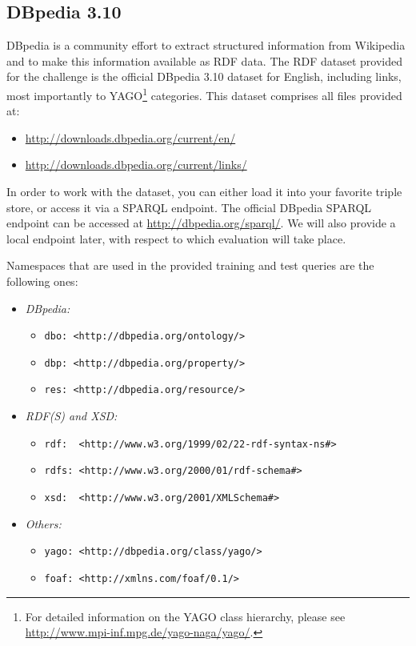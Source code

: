 

\subsection{DBpedia 3.10}
\label{sec:dbpedia}

DBpedia is a community effort to extract structured information from Wikipedia and to make this information available as RDF data. 
The RDF dataset provided for the challenge is the official DBpedia 3.10 dataset for English, including links, most importantly to YAGO\footnote{For detailed information on the YAGO class hierarchy, please see \url{http://www.mpi-inf.mpg.de/yago-naga/yago/}.} categories. This dataset comprises all files provided at: 
\begin{itemize}
\item \url{http://downloads.dbpedia.org/current/en/}
\item \url{http://downloads.dbpedia.org/current/links/}
\end{itemize}
In order to work with the dataset, you can either load it into your favorite triple store, or access it via a SPARQL endpoint. 
The official DBpedia SPARQL endpoint can be accessed at \url{http://dbpedia.org/sparql/}. 
We will also provide a local endpoint later, with respect to which evaluation will take place.

Namespaces that are used in the provided training and test queries are the following ones:
\begin{itemize}
\item \emph{DBpedia:}
  \begin{itemize}
  \item[] \texttt{dbo: <http://dbpedia.org/ontology/>} 
  \item[] \texttt{dbp: <http://dbpedia.org/property/>} 
  \item[] \texttt{res: <http://dbpedia.org/resource/>} 
  \end{itemize}
\item \emph{RDF(S) and XSD:}
  \begin{itemize}
  \item[] \texttt{rdf:\ \ <http://www.w3.org/1999/02/22-rdf-syntax-ns\#>} 
  \item[] \texttt{rdfs: <http://www.w3.org/2000/01/rdf-schema\#>} 
  \item[] \texttt{xsd:\ \ <http://www.w3.org/2001/XMLSchema\#>}
  \end{itemize}
\item \emph{Others:}
  \begin{itemize}
  \item[] \texttt{yago: <http://dbpedia.org/class/yago/>} 
  \item[] \texttt{foaf: <http://xmlns.com/foaf/0.1/> } 
  \end{itemize}
\end{itemize}



